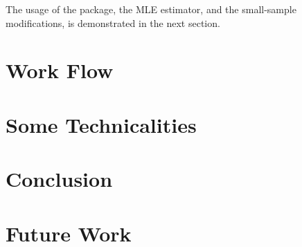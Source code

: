 \documentclass[article]{jss}
\begin{document}
The usage of the package, the MLE estimator, and the small-sample modifications, is demonstrated in the next section.

\section{Work Flow}





\section{Some Technicalities}


\section{Conclusion}


\section{Future Work}




\end{document}
